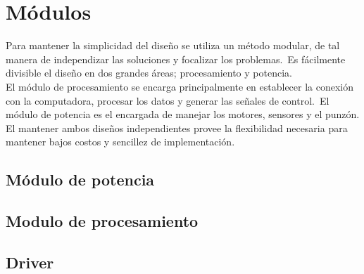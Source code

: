 \chapter{M\'odulos}

Para mantener la simplicidad del dise\~no se utiliza un m\'etodo modular, de
tal
manera de independizar las soluciones y focalizar los problemas.\
Es f\'acilmente divisible el dise\~no en dos grandes \'areas; procesamiento y
potencia.\\

El m\'odulo de procesamiento se encarga principalmente en establecer la
conexi\'on con la computadora, procesar los datos y generar las se\~nales de
control.\
El m\'odulo de potencia es el encargada de manejar los motores, sensores y el
punz\'on.\\

El mantener ambos dise\~nos independientes provee la flexibilidad necesaria
para mantener bajos costos y sencillez de implementaci\'on.


\section{M\'odulo de potencia}\label{cap:motors_section}


\section{Modulo de procesamiento}


\section{Driver}

